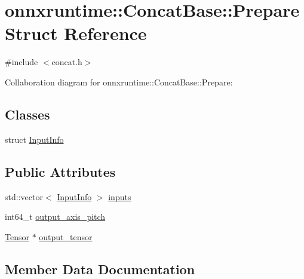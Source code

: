 \hypertarget{structonnxruntime_1_1ConcatBase_1_1Prepare}{}\section{onnxruntime\+:\+:Concat\+Base\+:\+:Prepare Struct Reference}
\label{structonnxruntime_1_1ConcatBase_1_1Prepare}


{\ttfamily \#include $<$concat.\+h$>$}



Collaboration diagram for onnxruntime\+:\+:Concat\+Base\+:\+:Prepare\+:
\subsection*{Classes}
\begin{DoxyCompactItemize}
\item 
struct \mbox{\hyperlink{structonnxruntime_1_1ConcatBase_1_1Prepare_1_1InputInfo}{Input\+Info}}
\end{DoxyCompactItemize}
\subsection*{Public Attributes}
\begin{DoxyCompactItemize}
\item 
std\+::vector$<$ \mbox{\hyperlink{structonnxruntime_1_1ConcatBase_1_1Prepare_1_1InputInfo}{Input\+Info}} $>$ \mbox{\hyperlink{structonnxruntime_1_1ConcatBase_1_1Prepare_ac5ba032a6799fdc6a92208a22c6b82b7}{inputs}}
\item 
int64\+\_\+t \mbox{\hyperlink{structonnxruntime_1_1ConcatBase_1_1Prepare_adf60065c0997888e31f2891996644f52}{output\+\_\+axis\+\_\+pitch}}
\item 
\mbox{\hyperlink{classonnxruntime_1_1Tensor}{Tensor}} $\ast$ \mbox{\hyperlink{structonnxruntime_1_1ConcatBase_1_1Prepare_a6511a98f052251feb4435c064bea594d}{output\+\_\+tensor}}
\end{DoxyCompactItemize}


\subsection{Member Data Documentation}
\mbox{\label{structonnxruntime_1_1ConcatBase_1_1Prepare_ac5ba032a6799fdc6a92208a22c6b82b7}} 
